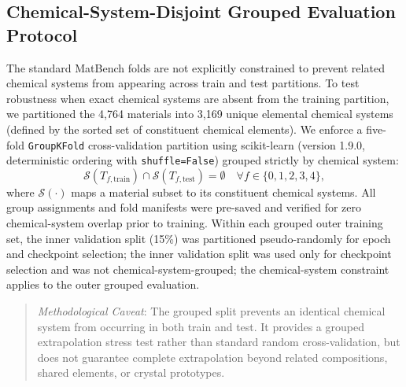 \documentclass[journal,article,submit,moreauthors,pdftex]{article}
\begin{document}
\begin{enumerate}
\end{enumerate}


\subsection{Chemical-System-Disjoint Grouped Evaluation Protocol}
The standard MatBench folds are not explicitly constrained to prevent related chemical systems from appearing across train and test partitions. To test robustness when exact chemical systems are absent from the training partition, we partitioned the 4,764 materials into 3,169 unique elemental chemical systems (defined by the sorted set of constituent chemical elements). We enforce a five-fold \texttt{GroupKFold} cross-validation partition using scikit-learn (version 1.9.0, deterministic ordering with \texttt{shuffle=False}) grouped strictly by chemical system:
\begin{equation}
    \mathcal{S}(T_{f,\mathrm{train}}) \cap \mathcal{S}(T_{f,\mathrm{test}}) = \emptyset \quad \forall f \in \{0, 1, 2, 3, 4\},
\end{equation}
where $\mathcal{S}(\cdot)$ maps a material subset to its constituent chemical systems. All group assignments and fold manifests were pre-saved and verified for zero chemical-system overlap prior to training. Within each grouped outer training set, the inner validation split (15\%) was partitioned pseudo-randomly for epoch and checkpoint selection; the inner validation split was used only for checkpoint selection and was not chemical-system-grouped; the chemical-system constraint applies to the outer grouped evaluation.

\begin{quote}
\small
\textit{Methodological Caveat}: The grouped split prevents an identical chemical system from occurring in both train and test. It provides a grouped extrapolation stress test rather than standard random cross-validation, but does not guarantee complete extrapolation beyond related compositions, shared elements, or crystal prototypes.
\end{quote}
\end{document}
